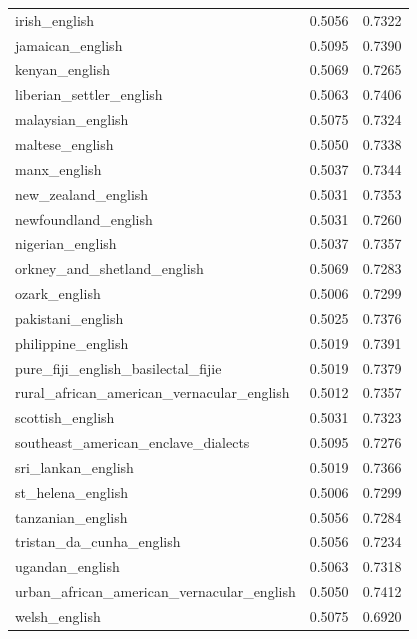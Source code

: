 \begin{landscape}
\begin{longtable}{lcc}
irish\_english & 0.5056 & 0.7322 \\
jamaican\_english & 0.5095 & 0.7390 \\
kenyan\_english & 0.5069 & 0.7265 \\
liberian\_settler\_english & 0.5063 & 0.7406 \\
malaysian\_english & 0.5075 & 0.7324 \\
maltese\_english & 0.5050 & 0.7338 \\
manx\_english & 0.5037 & 0.7344 \\
new\_zealand\_english & 0.5031 & 0.7353 \\
newfoundland\_english & 0.5031 & 0.7260 \\
nigerian\_english & 0.5037 & 0.7357 \\
orkney\_and\_shetland\_english & 0.5069 & 0.7283 \\
ozark\_english & 0.5006 & 0.7299 \\
pakistani\_english & 0.5025 & 0.7376 \\
philippine\_english & 0.5019 & 0.7391 \\
pure\_fiji\_english\_basilectal\_fijie & 0.5019 & 0.7379 \\
rural\_african\_american\_vernacular\_english & 0.5012 & 0.7357 \\
scottish\_english & 0.5031 & 0.7323 \\
southeast\_american\_enclave\_dialects & 0.5095 & 0.7276 \\
sri\_lankan\_english & 0.5019 & 0.7366 \\
st\_helena\_english & 0.5006 & 0.7299 \\
tanzanian\_english & 0.5056 & 0.7284 \\
tristan\_da\_cunha\_english & 0.5056 & 0.7234 \\
ugandan\_english & 0.5063 & 0.7318 \\
urban\_african\_american\_vernacular\_english & 0.5050 & 0.7412 \\
welsh\_english & 0.5075 & 0.6920 \\
\bottomrule
\end{longtable}
\end{landscape}